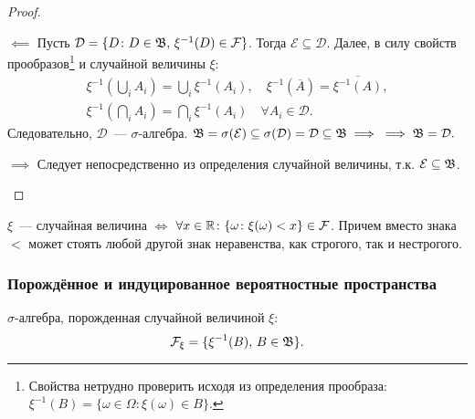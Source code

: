 \begin{proof}
    \begin{compactlist}
        \item[$\impliedby$] Пусть $\mathcal{D} = \{D \colon D \in \mathfrak{B}, \, \xi^{-1}(D) \in \mathcal{F} \}$. Тогда $\mathcal{E} \subseteq \mathcal{D}$. Далее, в силу свойств прообразов\footnote{Свойства нетрудно проверить исходя из определения прообраза: ${\xi^{-1}(B) = \{\omega \in \Omega \colon \xi(\omega) \in B\}}$.} и случайной величины $\xi$:
    \begin{gather*}
        \xi^{-1}\left(\bigcup\limits_i A_i\right) 
        = \bigcup\limits_i \xi^{-1}(A_i), \quad
        \xi^{-1}(\overline{A}) 
        = \overline{\xi^{-1}(A)}, \\
        \xi^{-1}\left(\bigcap\limits_i A_i\right) = \bigcap\limits_i \xi^{-1}(A_i) \quad \forall A_i \in \mathcal{D}.
    \end{gather*}
    Следовательно, $\mathcal{D}$~--- ${\sigma \text{-алгебра}}$. $\mathfrak{B} = \sigma(\mathcal{E}) \subseteq \sigma(\mathcal{D}) = \mathcal{D} \subseteq \mathfrak{B} \implies \\ \implies \mathfrak{B} = \mathcal{D}.$
    
    \item[$\implies$] Следует непосредственно из определения случайной величины, т.к. ${\mathcal{E} \subseteq \mathfrak{B}}$.
    \end{compactlist}
\end{proof}

\begin{crlr}
    $\xi$~--- случайная величина $\iff$ $\forall x \in \mathbb{R} \colon \{\omega \colon \xi(\omega) < x \} \in \mathcal{F}$. 
    Причем вместо знака $<$ может стоять любой другой знак неравенства, как строгого, так и нестрогого.
\end{crlr}

\subsubsection{Порождённое и индуцированное вероятностные пространства}
\begin{defn}
    $\sigma\text{-алгебра}$, порожденная случайной величиной $\xi$:
    \begin{equation*}
        \mathcal{F}_\xi = \{\xi^{-1}(B), \, B \in \mathfrak{B} \}.
    \end{equation*}
\end{defn}

